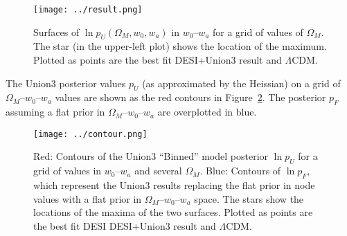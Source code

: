 \documentclass[11pt, oneside]{article}   	%
\begin{document}
\begin{figure}[htbp] %
   \centering
   \texttt{[image: ../result.png]} 
   \caption{Surfaces of $\ln{p_U}(\Omega_M, w_0,w_a)$  in $w_0$--$w_a$ for a grid of values of $\Omega_M$.    The star (in the upper-left plot) shows the location of the maximum.
   Plotted as points are the best fit  DESI+Union3
   result and  $\Lambda$CDM.}
   \label{fig:priors}
\end{figure}

The Union3 posterior values $p_U$ (as approximated by the Heissian)  on a grid of $\Omega_M$--$w_0$--$w_a$ values
are shown as the red contours in Figure~\ref{fig:posterior}.   The posterior $p_F$ assuming a flat
prior in $\Omega_M$--$w_0$--$w_a$  are overplotted in blue.
\begin{figure}[htbp] %
   \centering
   \texttt{[image: ../contour.png]} 
   \caption{Red: Contours of the Union3 ``Binned'' model  posterior  $\ln{p_U}$ for a grid of values
   in $w_0$--$w_a$ and several $\Omega_M$.  
   Blue: Contours of  $\ln{p_F}$, which represent the Union3 results replacing the flat prior in node values
   with a flat prior in  $\Omega_M$--$w_0$--$w_a$ space. 
   The stars show the locations of the maxima
   of the two surfaces. Plotted as points are the best fit DESI DESI+Union3
   result and  $\Lambda$CDM.}
   \label{fig:posterior}
\end{figure}
\end{document}
